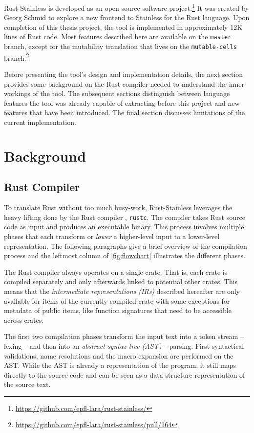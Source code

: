 Rust-Stainless is developed as an open source software
project.\footnote{\url{https://github.com/epfl-lara/rust-stainless/}} It was
created by Georg Schmid to explore a new frontend to Stainless for the Rust
language. Upon completion of this thesis project, the tool is implemented in
approximately 12K lines of Rust code. Most features described here are available
on the \lstinline!master! branch, except for the mutability translation that
lives on the \lstinline!mutable-cells!
branch.\footnote{\url{https://github.com/epfl-lara/rust-stainless/pull/164}}

Before presenting the tool's design and implementation details, the next section
provides some background on the Rust compiler needed to understand the inner
workings of the tool. The subsequent sections distinguish between language
features the tool was already capable of extracting before this project and new
features that have been introduced. The final section discusses limitations of
the current implementation.


\section{Background}

\subsection{Rust Compiler}

To translate Rust without too much busy-work, Rust-Stainless leverages the heavy
lifting done by the Rust compiler \cite{rustc-guide}, \lstinline!rustc!. The
compiler takes Rust source code as input and produces an executable binary. This
process involves multiple phases that each transform or \emph{lower} a
higher-level input to a lower-level representation. The following paragraphs
give a brief overview of the compilation process and the leftmost column of
\autoref{fig:flowchart} illustrates the different phases.

The Rust compiler always operates on a single crate. That is, each crate is
compiled separately and only afterwards linked to potential other crates. This
means that the \emph{intermediate representations (IRs)} described hereafter are
only available for items of the currently compiled crate with some exceptions
for metadata of public items, like function signatures that need to be
accessible across crates.

The first two compilation phases transform the input text into a token stream --
lexing -- and then into an \emph{abstract syntax tree (AST)} -- parsing. First
syntactical validations, name resolutions and the macro expansion are performed
on the AST. While the AST is already a representation of the program, it still
maps directly to the source code and can be seen as a data structure
representation of the source text.

